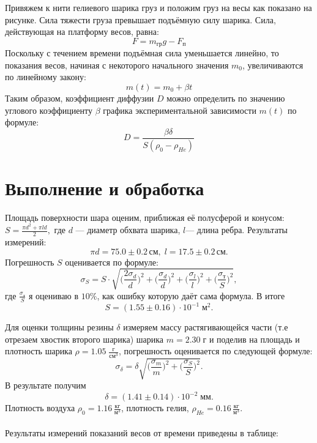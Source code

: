 \documentclass[a4paper,12pt]{article}
\begin{document}
Привяжем к нити гелиевого шарика груз и положим груз на весы как показано на рисунке. Сила тяжести груза превышает подъёмную силу шарика. Сила, действующая на платформу весов, равна:
\begin{equation}
F=m_{гр}g-F_п
\end{equation}
Поскольку с течением времени подъёмная сила уменьшается линейно,
то показания весов, начиная с некоторого начального значения $m_0$, увеличиваются по линейному закону:
\begin{equation}
m(t)=m_0+\beta t
\end{equation}Таким образом, коэффициент диффузии $D$ можно определить по значению углового коэффициенту $\beta$ графика экспериментальной зависимости $m(t)$ по формуле:
\begin{equation}
D=\frac{\beta \delta } { S(\rho_0-\rho_{He})}
\end{equation}
\section{Выполнение и обработка}
Площадь  поверхности шара оценим, приближая её полусферой и конусом: $S = \frac{\pi d^2 + \pi ld}{2},$ где $d$ — диаметр обхвата шарика, $l$— длина ребра. Результаты измерений:
$$ \pi d = 75.0 \pm 0.2 \, см,  \; l = 17.5 \pm 0.2\,  см.$$
Погрешность $S$ оценивается по формуле:
$$\sigma_S = S \cdot \sqrt{\Big(\frac{2\sigma_{d}}{d}\Big)^2+\Big(\frac{\sigma_{d}}{d}\Big)^2+\Big(\frac{\sigma_{l}}{l}\Big)^2 + \Big(\frac{\sigma_{т}}{S}\Big)^2},$$
где $\frac{\sigma_{т}}{S}$ я оцениваю в $10\%$, как ошибку которую даёт сама формула. В итоге $$S = (1.55 \pm 0.16) \cdot 10^{-1}\; м^2.$$ 

Для оценки толщины резины $\delta$ измеряем массу растягивающейся части (т.е отрезаем хвостик второго шарика) шарика $m=2.30 \; г$ и поделив на площадь и плотность шарика $\rho = 1.05 \; \frac{г}{см^3}$, погрешность оценивается по следующей формуле:
$$\sigma_{\delta} = \delta \sqrt{\Big(\frac{\sigma_{m}}{m}\Big)^2+ \Big(\frac{\sigma_{S}}{S}\Big)^2}.$$ 
В результате получим $$\delta = (1.41 \pm 0.14) \cdot 10^{-2} \; мм.$$
Плотность воздуха  $\rho_0=1.16\,  \frac{кг}{м^3}$, плотность гелия, $ \rho_{He}=0.16 \,  \frac{кг}{м^3}$.
\\\\
Результаты измерений показаний весов от времени приведены в таблице:

\end{document}
